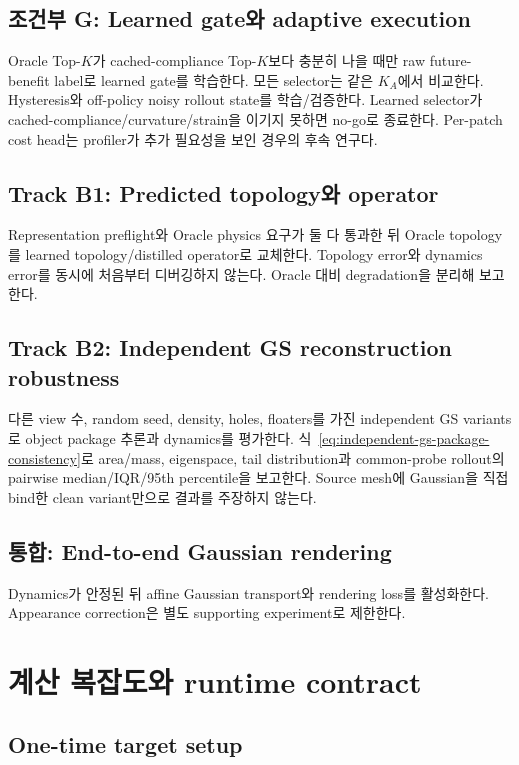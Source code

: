 \documentclass[11pt,a4paper]{article}
\begin{document}
\subsection{조건부 G: Learned gate와 adaptive execution}

Oracle Top-\(K\)가 cached-compliance Top-\(K\)보다 충분히 나을 때만
raw future-benefit label로 learned gate를 학습한다.
모든 selector는 같은 \(K_A\)에서 비교한다.
Hysteresis와 off-policy noisy rollout state를 학습/검증한다.
Learned selector가 cached-compliance/curvature/strain을 이기지 못하면 no-go로 종료한다.
Per-patch cost head는 profiler가 추가 필요성을 보인 경우의 후속 연구다.

\subsection{Track B1: Predicted topology와 operator}

Representation preflight와 Oracle physics 요구가 둘 다 통과한 뒤
Oracle topology를 learned topology/distilled operator로 교체한다.
Topology error와 dynamics error를 동시에 처음부터 디버깅하지 않는다.
Oracle 대비 degradation을 분리해 보고한다.

\subsection{Track B2: Independent GS reconstruction robustness}

다른 view 수, random seed, density, holes, floaters를 가진 independent GS variants로
object package 추론과 dynamics를 평가한다.
식~\eqref{eq:independent-gs-package-consistency}로 area/mass, eigenspace,
tail distribution과 common-probe rollout의 pairwise median/IQR/95th percentile을 보고한다.
Source mesh에 Gaussian을 직접 bind한 clean variant만으로 결과를 주장하지 않는다.

\subsection{통합: End-to-end Gaussian rendering}

Dynamics가 안정된 뒤 affine Gaussian transport와 rendering loss를 활성화한다.
Appearance correction은 별도 supporting experiment로 제한한다.

\section{계산 복잡도와 runtime contract}

\subsection{One-time target setup}
\end{document}
